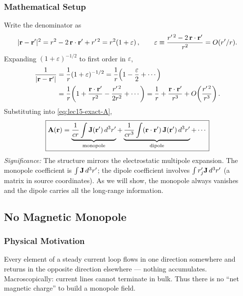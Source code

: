 \subsubsection*{Mathematical Setup}

Write the denominator as
\begin{equation}\label{eq:lec15-denom}
  |\mathbf{r}-\mathbf{r}'|^2 = r^2 - 2\,\mathbf{r}\cdot\mathbf{r}' + r'^{\,2}
  = r^2\!\left(1 + \varepsilon\right),\qquad
  \varepsilon \equiv \frac{r'^{\,2} - 2\,\mathbf{r}\cdot\mathbf{r}'}{r^2} = O(r'/r).
\end{equation}
Expanding $(1+\varepsilon)^{-1/2}$ to first order in $\varepsilon$,
\begin{align}
  \frac{1}{|\mathbf{r}-\mathbf{r}'|}
  &= \frac{1}{r}(1+\varepsilon)^{-1/2}
   = \frac{1}{r}\!\left(1 - \frac{\varepsilon}{2} + \cdots\right) \notag\\
  &= \frac{1}{r}\!\left(1 + \frac{\mathbf{r}\cdot\mathbf{r}'}{r^2}
     - \frac{r'^{\,2}}{2r^2} + \cdots\right)
   = \frac{1}{r} + \frac{\mathbf{r}\cdot\mathbf{r}'}{r^3} + O\!\left(\frac{r'^{\,2}}{r^3}\right).
   \label{eq:lec15-1overR}
\end{align}
Substituting into \eqref{eq:lec15-exact-A},
\begin{equation}\label{eq:lec15-expansion}
  \boxed{
    \mathbf{A}(\mathbf{r}) = \underbrace{\frac{1}{cr}\int\mathbf{J}(\mathbf{r}')\,d^3r'}_{\text{monopole}}
    + \underbrace{\frac{1}{cr^3}\int(\mathbf{r}\cdot\mathbf{r}')\,\mathbf{J}(\mathbf{r}')\,d^3r'}_{\text{dipole}}
    + \cdots
  }
\end{equation}
\textit{Significance:} The structure mirrors the electrostatic multipole expansion.
The monopole coefficient is $\int\mathbf{J}\,d^3r'$; the dipole coefficient involves
$\int r'_j\mathbf{J}\,d^3r'$ (a matrix in source coordinates).  As we will show, the
monopole always vanishes and the dipole carries all the long-range information.

\subsection{No Magnetic Monopole}\label{subsec:lec15-no-monopole}

\subsubsection*{Physical Motivation}

Every element of a steady current loop flows in one direction somewhere and returns
in the opposite direction elsewhere — nothing accumulates.  Macroscopically: current
lines cannot terminate in bulk.  Thus there is no ``net magnetic charge'' to build a
monopole field.


